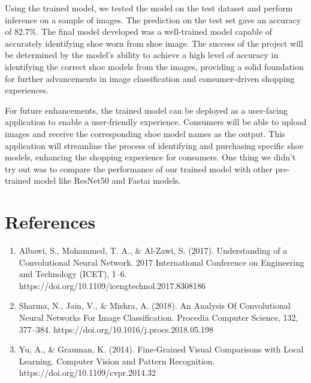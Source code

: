 \documentclass[11pt,a4paper]{article}
\begin{document}
Using the trained model, we tested the model on the test dataset and perform inference on a sample of images.  The prediction on the test set gave an accuracy of 82.7\%.  The final model developed was a well-trained model capable of accurately identifying shoe worn from shoe image. The success of the project will be determined by the model's ability to achieve a high level of accuracy in identifying the correct shoe models from the images, providing a solid foundation for further advancements in image classification and consumer-driven shopping experiences. 

For future enhancements, the trained model can be deployed as a user-facing application to enable a user-friendly experience. Consumers will be able to upload images and receive the corresponding shoe model names as the output. This application will streamline the process of identifying and purchasing specific shoe models, enhancing the shopping experience for consumers.  One thing we didn't try out was to compare the performance of our trained model with other pre-trained model like ResNet50 and Fastai models.
\section{References} 
		\begin{enumerate}
		\item Albawi, S., Mohammed, T. A., \& Al-Zawi, S. (2017). Understanding of a Convolutional Neural Network. 2017 International Conference on Engineering and Technology (ICET), 1–6. https://doi.org/10.1109/icengtechnol.2017.8308186  
		\item Sharma, N., Jain, V., \& Mishra, A. (2018). An Analysis Of Convolutional Neural Networks For Image Classification. Procedia Computer Science, 132, 377–384. https://doi.org/10.1016/j.procs.2018.05.198
		\item Yu, A., \& Grauman, K. (2014). Fine-Grained Visual Comparisons with Local Learning. Computer Vision and Pattern Recognition. https://doi.org/10.1109/cvpr.2014.32 
		\end{enumerate}
\end{document}
